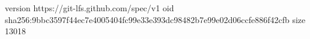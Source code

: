 version https://git-lfs.github.com/spec/v1
oid sha256:9bbc3597f44ec7e4005404fc99e33e393dc98482b7e99e02d06ccfe886f42cfb
size 13018
